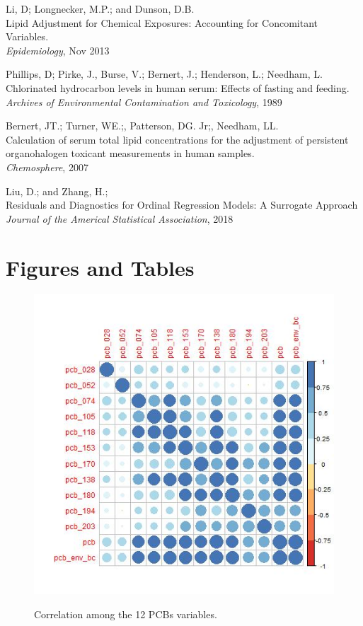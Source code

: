 \documentclass[10pt]{jmlr}%
\begin{document}
\newpage %
\begin{thebibliography}{99} %
	
	 Li, D; Longnecker, M.P.; and Dunson, D.B. \\
	\newblock Lipid Adjustment for Chemical Exposures: Accounting for Concomitant Variables.\\
	\newblock \emph{Epidemiology}, Nov 2013
	
	 Phillips, D; Pirke, J., Burse, V.; Bernert, J.; Henderson, L.; Needham, L.\\
	\newblock Chlorinated hydrocarbon levels in human serum: Effects of fasting and feeding.\\
	\newblock \emph{Archives of Environmental Contamination and Toxicology}, 1989
	
	 Bernert, JT.; Turner, WE.;, Patterson, DG. Jr;, Needham, LL.\\
	\newblock Calculation of serum total lipid concentrations for the adjustment of persistent organohalogen toxicant measurements in human samples.\\
	\newblock \emph{Chemosphere}, 2007
	
	 Liu, D.; and Zhang, H.;\\
	\newblock Residuals and Diagnostics for Ordinal Regression Models: A Surrogate Approach\\
	\newblock \emph{Journal of the Americal Statistical Association}, 2018
	
\end{thebibliography}


\newpage
\appendix

\section{Figures and Tables}
\label{appendix:fig}

\begin{figure}[htbp]
	\centering
	\caption{Correlation among the 12 PCBs variables.}
	\includegraphics[width=0.5\linewidth]{pcb_corr}
	\label{fig:corr}
\end{figure}
\end{document}
